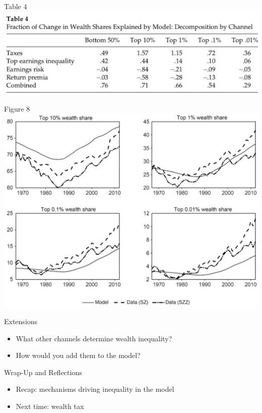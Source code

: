 \documentclass[aspectratio=169,mathserif]{beamer}
\begin{document}
\begin{frame}{Table 4}
    \centering
    \includegraphics[scale = 0.7]{HKS_Tab_4.png}
\end{frame}
\begin{frame}{Figure 8}
    \centering
    \includegraphics[scale = 0.5]{HKS_Fig_8.png}
\end{frame}


\begin{frame}{Extensions}
    \begin{itemize}
        \item What other channels determine wealth inequality?
        \item How would you add them to the model?
    \end{itemize}
\end{frame}

\begin{frame}{Wrap-Up and Reflections}
\begin{itemize}
    \item Recap: mechanisms driving inequality in the model
    \item Next time: wealth tax
\end{itemize}
\end{frame}
\end{document}
